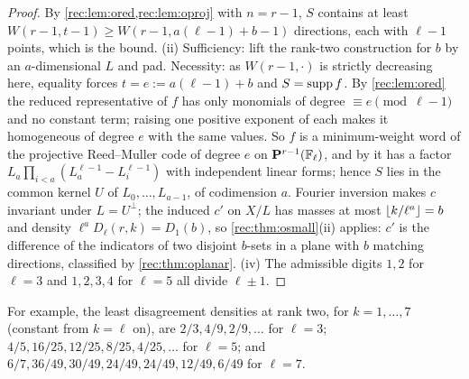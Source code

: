 \begin{proof}
By \cref{rec:lem:ored,rec:lem:oproj} with $n=r-1$, $S$ contains at least $W(r-1,t-1)\ge W(r-1,a(\ell-1)+b-1)$ directions, each
with $\ell-1$ points, which is the bound. (ii) Sufficiency: lift the rank-two construction for $b$ by an $a$-dimensional $L$ and pad. Necessity: as
$W(r-1,\cdot)$ is strictly decreasing here, equality forces $t=e:=a(\ell-1)+b$ and $S=\operatorname{supp} f$. By \cref{rec:lem:ored}
the reduced representative of $f$ has only monomials of degree $\equiv e\pmod{\ell-1}$ and no constant term;
raising one positive exponent of each makes it homogeneous of degree $e$ with the same values. So $f$ is a
minimum-weight word of the projective Reed--Muller code of degree $e$ on $\mathbf P^{r-1}(\mathbb{F}_\ell)$, and by
\cite[Thm.~4.3]{GhorpadeLudhani2024Minimum} it has a factor $L_a\prod_{i<a}(L_a^{\ell-1}-L_i^{\ell-1})$ with independent linear
forms; hence $S$ lies in the common kernel $U$ of $L_0,\dots,L_{a-1}$, of codimension $a$. Fourier inversion makes $c$
invariant under $L=U^\perp$; the induced $c'$ on $X/L$ has masses at most $\lfloor k/\ell^a\rfloor=b$ and density $\ell^aD_\ell(r,k)=D_1(b)$,
so \cref{rec:thm:osmall}(ii) applies: $c'$ is the difference of the indicators of two disjoint $b$-sets in a plane
with $b$ matching directions, classified by \cref{rec:thm:oplanar}. (iv) The admissible digits $1,2$ for $\ell=3$ and $1,2,3,4$ for $\ell=5$ all divide $\ell\pm1$.
\end{proof}

For example, the least disagreement densities at rank two, for $k=1,\dots,7$ (constant from $k=\ell$ on), are
$2/3,4/9,2/9,\dots$ for $\ell=3$; $4/5,16/25,12/25,8/25,4/25,\dots$ for $\ell=5$; and
$6/7,36/49,30/49,24/49,24/49,12/49,6/49$ for $\ell=7$.

